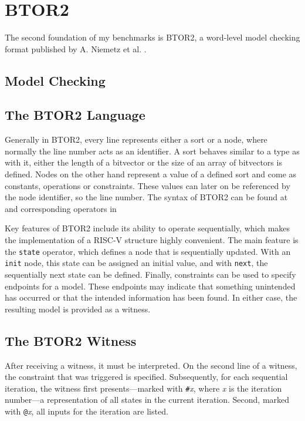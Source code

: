 \chapter{BTOR2}\label{chap:btor2}

The second foundation of my benchmarks is BTOR2, a word-level model checking
format published by A. Niemetz et al. \cite{btor2}.

\section{Model Checking}

\section{The BTOR2 Language}
Generally in BTOR2, every line represents either a sort or a node, where
normally the line number acts as an identifier. A sort behaves similar to a
type as with it, either the length of a bitvector or the size of an array of
bitvectors is defined. Nodes on the other hand represent a value of a defined
sort and come as constants, operations or constraints. These values can later
on be referenced by the node identifier, so the line number. The syntax of
BTOR2 can be found at \cite[figure 1]{btor2} and corresponding operators in
\cite[table 1]{btor2}

Key features of BTOR2 include its ability to operate sequentially, which makes
the implementation of a RISC-V structure highly convenient. The main feature is
the \texttt{state} operator, which defines a node that is sequentially updated.
With an \texttt{init} node, this state can be assigned an initial value, and
with \texttt{next}, the sequentially next state can be defined. Finally,
constraints can be used to specify endpoints for a model. These endpoints may
indicate that something unintended has occurred or that the intended
information has been found. In either case, the resulting model is provided as
a witness.

\section{The BTOR2 Witness}\label{witness}
After receiving a witness, it must be interpreted. On the second line of a
witness, the constraint that was triggered is specified. Subsequently, for each
sequential iteration, the witness first presents—marked with
\texttt{\#}\textit{x}, where \textit{x} is the iteration number—a
representation of all states in the current iteration. Second, marked with
\texttt{@}\textit{x}, all inputs for the iteration are listed.